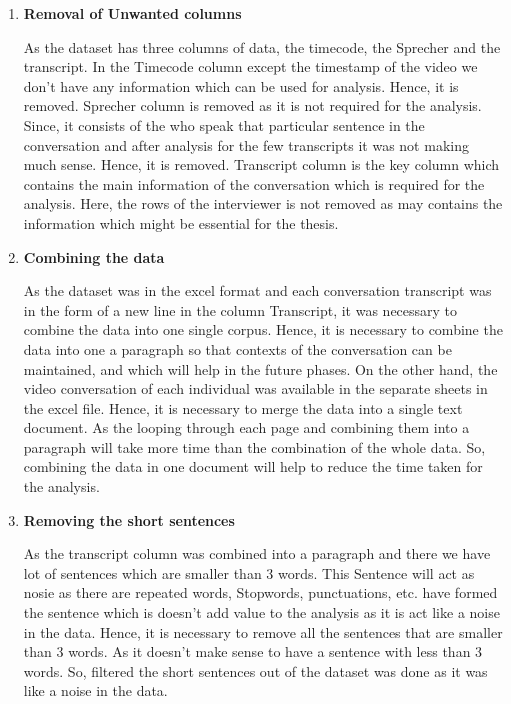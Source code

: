 \begin{enumerate}
    \item\textbf{Removal of Unwanted columns}
    
    As the dataset has three columns of data, the timecode, the Sprecher and the transcript. In the Timecode column except 
    the timestamp of the video we don't have any information which can be used for analysis. Hence, it is removed.
    Sprecher column is removed as it is not required for the analysis. Since, it consists of the who speak that particular 
    sentence in the conversation and after analysis for the few transcripts it was not making much sense. Hence, it is removed.
    Transcript column is the key column which contains the main information of the conversation which is required for the analysis. 
    Here, the rows of the interviewer is not removed as may  contains the information which might be essential for the thesis.

    \item\textbf{Combining the data}
    
    As the dataset was in the excel format and each conversation transcript was in the form of a new line in the column 
    Transcript, it was necessary to combine the data into one single corpus. Hence, it is necessary to combine the data into 
    one a paragraph so that contexts of the conversation can be maintained, and which will help in the future phases. 
    On the other hand, the video conversation of each individual was available in the separate sheets in the excel file. 
    Hence, it is necessary to merge the data into a single text document. As the looping through each page and combining 
    them into a paragraph will take more time than the combination of the whole data. So, combining the data in one document
    will help to reduce the time taken for the analysis.

    \item\textbf{Removing the short sentences}
    
    As the transcript column was combined into a paragraph and there we have lot of sentences which are smaller than 3 words.
     This Sentence will act as nosie as there are repeated words, Stopwords, punctuations, etc. have formed the sentence which 
     is doesn't add value to the analysis as it is act like a noise in the data. Hence, it is necessary to remove all the sentences 
     that are smaller than 3 words. As it doesn't make sense to have a sentence with less than 3 words. So, filtered the short 
     sentences out of the dataset was done as it was like a noise in the data.

\end{enumerate}


